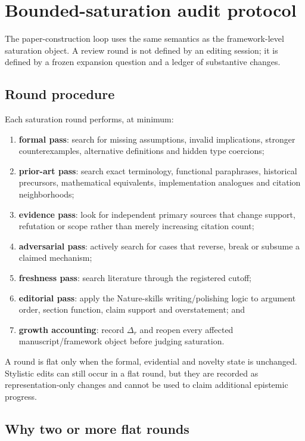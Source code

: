 \section{Bounded-saturation audit protocol}

The paper-construction loop uses the same semantics as the framework-level saturation object. A review round is not defined by an editing session; it is defined by a frozen expansion question and a ledger of substantive changes.

\subsection{Round procedure}

Each saturation round performs, at minimum:

\begin{enumerate}[leftmargin=*]
\item \textbf{formal pass}: search for missing assumptions, invalid implications, stronger counterexamples, alternative definitions and hidden type coercions;
\item \textbf{prior-art pass}: search exact terminology, functional paraphrases, historical precursors, mathematical equivalents, implementation analogues and citation neighborhoods;
\item \textbf{evidence pass}: look for independent primary sources that change support, refutation or scope rather than merely increasing citation count;
\item \textbf{adversarial pass}: actively search for cases that reverse, break or subsume a claimed mechanism;
\item \textbf{freshness pass}: search literature through the registered cutoff;
\item \textbf{editorial pass}: apply the Nature-skills writing/polishing logic to argument order, section function, claim support and overstatement; and
\item \textbf{growth accounting}: record \(\Delta_r\) and reopen every affected manuscript/framework object before judging saturation.
\end{enumerate}

A round is flat only when the formal, evidential and novelty state is unchanged. Stylistic edits can still occur in a flat round, but they are recorded as representation-only changes and cannot be used to claim additional epistemic progress.

\subsection{Why two or more flat rounds}

